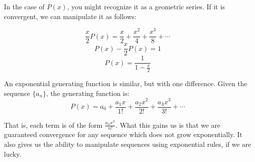 \documentclass{article}
\begin{document}
In the case of $P(x)$, you might recognize it as a geometric series. If it is convergent,
we can manipulate it as follows:

\[ \frac{x}{2} P(x) = \frac{x}{2} + \frac{x^2}{4} + \frac{x^3}{8} + \cdots \]
\[ P(x) - \frac{x}{2} P(x) = 1 \]
\[ P(x) = \frac{1}{1-\frac{x}{2}} \]

An exponential generating function is similar, but with one difference. Given the sequence
$\{a_n\}$, the generating function is:
\[ P(x) = a_0 + \frac{a_1x}{1!} + \frac{a_2x^2}{2!} + \frac{a_3x^3}{3!} + \cdots \]

That is, each term is of the form $\frac{a_nx^n}{n!}$. What this gains us is that we are
guaranteed convergence for any sequence which does not grow exponentially. It also gives
us the ability to manipulate sequences using exponential rules, if we are lucky.
\end{document}
